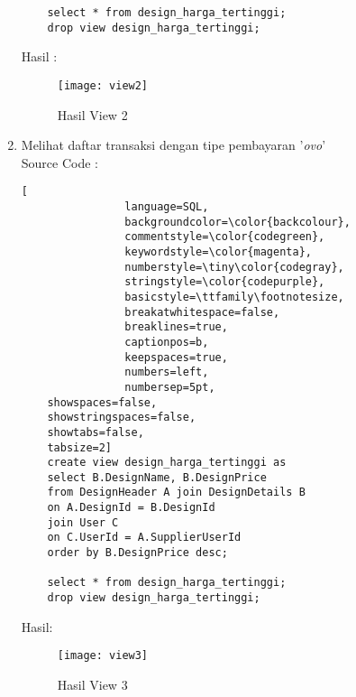 \begin{enumerate}
\begin{lstlisting}
	select * from design_harga_tertinggi;
	drop view design_harga_tertinggi;
			\end{lstlisting}
		Hasil : 
		\\
		\begin{figure}[H]
			\centering
			\texttt{[image: view2]}
			\caption{Hasil View 2}
		\end{figure}
	
	\item 	Melihat daftar transaksi dengan tipe pembayaran '\textit{ovo}' \\
			Source Code :
			\begin{lstlisting}[
				language=SQL,
				backgroundcolor=\color{backcolour},   
				commentstyle=\color{codegreen},
				keywordstyle=\color{magenta},
				numberstyle=\tiny\color{codegray},
				stringstyle=\color{codepurple},
				basicstyle=\ttfamily\footnotesize,
				breakatwhitespace=false,         
				breaklines=true,                 
				captionpos=b,                    
				keepspaces=true,                 
				numbers=left,                    
				numbersep=5pt,                  
	showspaces=false,                
	showstringspaces=false,
	showtabs=false,                  
	tabsize=2]
	create view design_harga_tertinggi as
	select B.DesignName, B.DesignPrice
	from DesignHeader A join DesignDetails B
	on A.DesignId = B.DesignId
	join User C
	on C.UserId = A.SupplierUserId
	order by B.DesignPrice desc;
	
	select * from design_harga_tertinggi;
	drop view design_harga_tertinggi;
			\end{lstlisting}
		Hasil:
		\\
		\begin{figure}[H]
			\centering
			\texttt{[image: view3]}
			\caption{Hasil View 3}
		\end{figure}
	

\end{enumerate}
